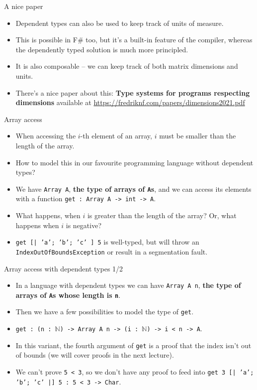 \documentclass{beamer}
\newcommand{\m}[1]{\texttt{#1}}
\begin{document}
\begin{frame}{A nice paper}
\begin{itemize}
	\item Dependent types can also be used to keep track of units of measure.
	\item This is possible in F\# too, but it's a built-in feature of the compiler, whereas the dependently typed solution is much more principled.
	\item It is also composable -- we can keep track of both matrix dimensions and units.
	\item There's a nice paper about this: \textbf{Type systems for programs respecting dimensions} available at \url{https://fredriknf.com/papers/dimensions2021.pdf}
\end{itemize}
\end{frame}

\begin{frame}{Array access}
\begin{itemize}
	\item When accessing the $i$-th element of an array, $i$ must be smaller than the length of the array.
	\item How to model this in our favourite programming language without dependent types?
	\item We have \m{Array A}, \textbf{the type of arrays of \m{A}s}, and we can access its elements with a function \m{get :\ Array A -> int -> A}.
	\item What happens, when $i$ is greater than the length of the array? Or, what happens when $i$ is negative?
	\item \m{get [| 'a'; 'b'; 'c' ] 5} is well-typed, but will throw an \m{IndexOutOfBoundsException} or result in a segmentation fault.
\end{itemize}
\end{frame}

\begin{frame}{Array access with dependent types 1/2}
\begin{itemize}
	\item In a language with dependent types we can have \m{Array A n}, \textbf{the type of arrays of \m{A}s whose length is \m{n}}.
	\item Then we have a few possibilities to model the type of \m{get}.
	\item \m{get :\ (n :\ $\mathbb{N}$) -> Array A n -> (i :\ $\mathbb{N}$) -> i < n -> A}.
	\item In this variant, the fourth argument of \m{get} is a proof that the index isn't out of bounds (we will cover proofs in the next lecture).
	\item We can't prove \m{5 < 3}, so we don't have any proof to feed into \m{get 3 [| 'a'; 'b'; 'c' |] 5 :\ 5 < 3 -> Char}.
\end{itemize}
\end{frame}
\end{document}

